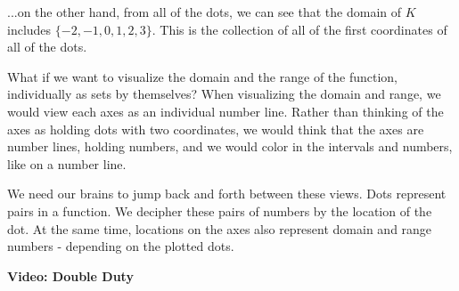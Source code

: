 \documentclass{ximera}
\begin{document}
...on the other hand, from all of the dots, we can see that the domain of $K$ includes $\{ -2, -1, 0, 1, 2, 3 \}$.  This is the collection of all of the first coordinates of all of the dots.


What if we want to visualize the domain and the range of the function, individually as sets by themselves?  When visualizing the domain and range, we would view each axes as an individual number line.  Rather than thinking of the axes as holding dots with two coordinates, we would think that the axes are number lines, holding numbers, and we would color in the intervals and numbers, like on a number line.

We need our brains to jump back and forth between these views.  Dots represent pairs in a function.  We decipher these pairs of numbers by the location of the dot.  At the same time, locations on the axes also represent domain and range numbers - depending on the plotted dots.







\begin{explanation} \textbf{\textcolor{red!75!green}{Video: Double Duty}}

\begin{onlineOnly}
\begin{expandable} 

\begin{center}
\end{center}

\end{expandable}
\end{onlineOnly}

\end{explanation}
\end{document}

